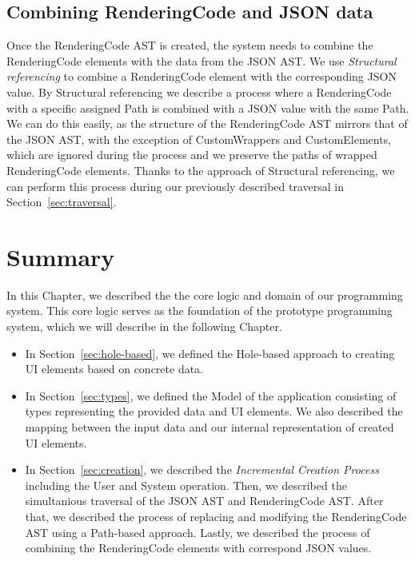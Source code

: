 \subsection{Combining RenderingCode and JSON data}
Once the RenderingCode AST is created, the system needs to combine the RenderingCode elements with the data from the JSON AST.
We use \emph{Structural referencing} to combine a RenderingCode element with the corresponding JSON value.
By Structural referencing we describe a process where a RenderingCode with a specific assigned Path is combined with a JSON value with the same Path.
We can do this easily, as the structure of the RenderingCode AST mirrors that of the JSON AST, with the exception of CustomWrappers and CustomElements,
which are ignored during the process and we preserve the paths of wrapped RenderingCode elements.
Thanks to the approach of Structural referencing, we can perform this process during our previously described traversal in Section~\ref{sec:traversal}.


\section{Summary}

In this Chapter, we described the the core logic and domain of our programming system.
This core logic serves as the foundation of the prototype programming system, which we will describe in the following Chapter.
\begin{itemize}
	\item In Section~\ref{sec:hole-based}, we defined the Hole-based approach to creating UI elements based on concrete data.

	\item In Section~\ref{sec:types}, we defined the Model of the application consisting of types representing the provided data and UI elements.
	      We also described the mapping between the input data and our internal representation of created UI elements.

	\item In Section~\ref{sec:creation}, we described the \emph{Incremental Creation Process} including the User and System operation.
	      Then, we described the simultanious traversal of the JSON AST and RenderingCode AST.
	      After that, we described the process of replacing and modifying the RenderingCode AST using a Path-based approach.
	      Lastly, we described the process of combining the RenderingCode elements with correspond JSON values.
\end{itemize}
